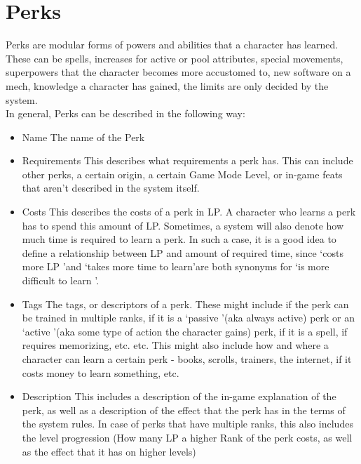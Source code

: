 \section{Perks}\label{sec:perks}
Perks are modular forms of powers and abilities that a character has learned.\\
These can be spells, increases for active or pool attributes, special movements, superpowers that the character becomes more accustomed to, new software on a mech, knowledge a character has gained, the limits are only decided by the system.\\
In general, Perks can be described in the following way:\\
\begin{itemize}
    \item Name
    The name of the Perk
    \item Requirements
    This describes what requirements a perk has.
    This can include other perks, a certain origin, a certain Game Mode Level, or in-game feats that aren't described in the system itself.
    \item Costs
    This describes the costs of a perk in LP.
    A character who learns a perk has to spend this amount of LP.
    Sometimes, a system will also denote how much time is required to learn a perk.
    In such a case, it is a good idea to define a relationship between LP and amount of required time, since \lq costs more LP \rq and \lq takes more time to learn\rq are both synonyms for \lq is more difficult to learn \rq.
    \item Tags
    The tags, or descriptors of a perk.
    These might include if the perk can be trained in multiple ranks, if it is a \lq passive \rq (aka always active) perk or an \lq active \rq (aka some type of action the character gains) perk, if it is a spell, if requires memorizing, etc. etc.
    This might also include how and where a character can learn a certain perk - books, scrolls, trainers, the internet, if it costs money to learn something, etc.
    \item Description
    This includes a description of the in-game explanation of the perk, as well as a description of the effect that the perk has in the terms of the system rules.
    In case of perks that have multiple ranks, this also includes the level progression (How many LP a higher Rank of the perk costs, as well as the effect that it has on higher levels)
\end{itemize}

